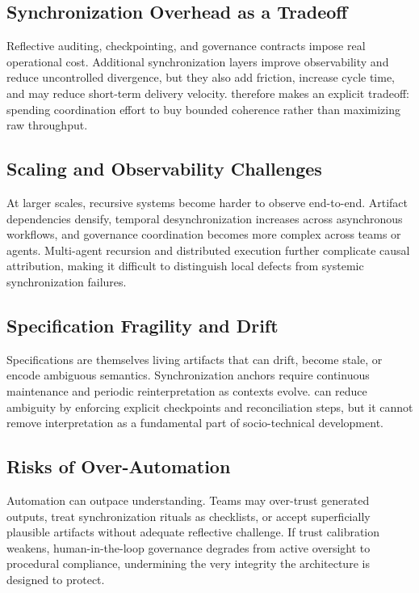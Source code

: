 \subsection{Synchronization Overhead as a Tradeoff}

Reflective auditing, checkpointing, and governance contracts impose real operational cost. Additional synchronization layers improve observability and reduce uncontrolled divergence, but they also add friction, increase cycle time, and may reduce short-term delivery velocity.  therefore makes an explicit tradeoff: spending coordination effort to buy bounded coherence rather than maximizing raw throughput.

\subsection{Scaling and Observability Challenges}

At larger scales, recursive systems become harder to observe end-to-end. Artifact dependencies densify, temporal desynchronization increases across asynchronous workflows, and governance coordination becomes more complex across teams or agents. Multi-agent recursion and distributed execution further complicate causal attribution, making it difficult to distinguish local defects from systemic synchronization failures.

\subsection{Specification Fragility and Drift}

Specifications are themselves living artifacts that can drift, become stale, or encode ambiguous semantics. Synchronization anchors require continuous maintenance and periodic reinterpretation as contexts evolve.  can reduce ambiguity by enforcing explicit checkpoints and reconciliation steps, but it cannot remove interpretation as a fundamental part of socio-technical development.

\subsection{Risks of Over-Automation}

Automation can outpace understanding. Teams may over-trust generated outputs, treat synchronization rituals as checklists, or accept superficially plausible artifacts without adequate reflective challenge. If trust calibration weakens, human-in-the-loop governance degrades from active oversight to procedural compliance, undermining the very integrity the architecture is designed to protect.

